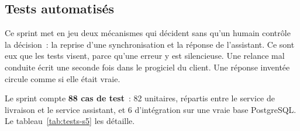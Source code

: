\subsection{Tests automatisés}

Ce sprint met en jeu deux mécanismes qui décident sans qu'un humain contrôle la décision~: la reprise
d'une synchronisation et la réponse de l'assistant. Ce sont eux que les tests visent, parce qu'une
erreur y est silencieuse. Une relance mal conduite écrit une seconde fois dans le progiciel du
client. Une réponse inventée circule comme si elle était vraie.

Le sprint compte \textbf{88 cas de test}~: 82 unitaires, répartis entre le service de livraison et le
service assistant, et 6 d'intégration sur une vraie base PostgreSQL.
Le tableau~\ref{tab:tests-s5} les détaille.

